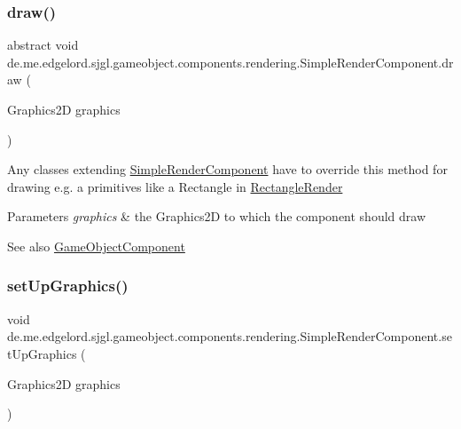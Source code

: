 \subsubsection{\texorpdfstring{draw()}{draw()}}
{\footnotesize\ttfamily abstract void de.\+me.\+edgelord.\+sjgl.\+gameobject.\+components.\+rendering.\+Simple\+Render\+Component.\+draw (\begin{DoxyParamCaption}\item[{Graphics2D}]{graphics }\end{DoxyParamCaption})\hspace{0.3cm}{\ttfamily [abstract]}}

Any classes extending \mbox{\hyperlink{classde_1_1me_1_1edgelord_1_1sjgl_1_1gameobject_1_1components_1_1rendering_1_1_simple_render_component}{Simple\+Render\+Component}} have to override this method for drawing e.\+g. a primitives like a Rectangle in \mbox{\hyperlink{classde_1_1me_1_1edgelord_1_1sjgl_1_1gameobject_1_1components_1_1rendering_1_1_rectangle_render}{Rectangle\+Render}}


\begin{DoxyParams}{Parameters}
{\em graphics} & the Graphics2D to which the component should draw \\
\hline
\end{DoxyParams}
\begin{DoxySeeAlso}{See also}
\mbox{\hyperlink{classde_1_1me_1_1edgelord_1_1sjgl_1_1gameobject_1_1_game_object_component}{Game\+Object\+Component}} 
\end{DoxySeeAlso}
\mbox{\label{classde_1_1me_1_1edgelord_1_1sjgl_1_1gameobject_1_1components_1_1rendering_1_1_simple_render_component_a33ef64cd384ed8a5e224cdf628d212b1}} 
\subsubsection{\texorpdfstring{set\+Up\+Graphics()}{setUpGraphics()}}
{\footnotesize\ttfamily void de.\+me.\+edgelord.\+sjgl.\+gameobject.\+components.\+rendering.\+Simple\+Render\+Component.\+set\+Up\+Graphics (\begin{DoxyParamCaption}\item[{Graphics2D}]{graphics }\end{DoxyParamCaption})\hspace{0.3cm}{\ttfamily [protected]}}

